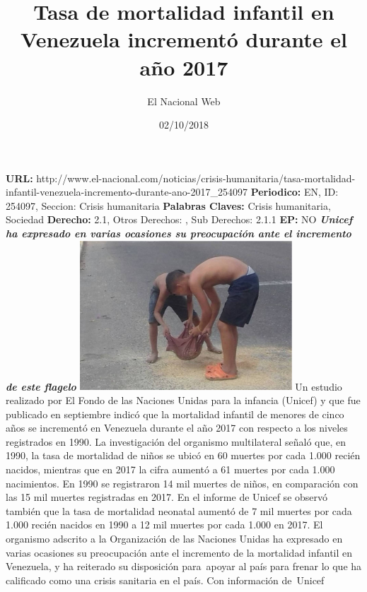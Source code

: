 \documentclass{article}%
\title{\textbf{Tasa de mortalidad infantil en Venezuela incrementó durante el año 2017}}%
\author{El Nacional Web}%
\date{02/10/2018}%
\begin{document}
%
\normalsize%
\maketitle%
\textbf{URL: }%
http://www.el{-}nacional.com/noticias/crisis{-}humanitaria/tasa{-}mortalidad{-}infantil{-}venezuela{-}incremento{-}durante{-}ano{-}2017\_254097\newline%
%
\textbf{Periodico: }%
EN, %
ID: %
254097, %
Seccion: %
Crisis humanitaria\newline%
%
\textbf{Palabras Claves: }%
Crisis humanitaria, Sociedad\newline%
%
\textbf{Derecho: }%
2.1, %
Otros Derechos: %
, %
Sub Derechos: %
2.1.1\newline%
%
\textbf{EP: }%
NO\newline%
\newline%
%
\textbf{\textit{Unicef ha expresado en varias ocasiones su preocupación ante el incremento de este flagelo}}%
\newline%
\newline%
%
\includegraphics[width=300px]{30.jpg}%
\newline%
%
Un estudio realizado por El Fondo de las Naciones Unidas para la infancia (Unicef) y que fue publicado en septiembre indicó que la mortalidad infantil de menores de cinco años se incrementó en Venezuela durante el año 2017 con respecto a los niveles registrados en 1990.%
\newline%
%
La investigación del organismo multilateral señaló que, en 1990, la tasa de mortalidad de niños se ubicó en 60 muertes por cada 1.000 recién nacidos, mientras que en 2017 la cifra aumentó a 61 muertes por cada 1.000 nacimientos.%
\newline%
%
En 1990 se registraron 14 mil muertes de niños, en comparación con las 15 mil muertes registradas en 2017.%
\newline%
%
En el informe de Unicef se observó también que la tasa de mortalidad neonatal aumentó de 7 mil muertes por cada 1.000 recién nacidos en 1990 a 12 mil muertes por cada 1.000 en 2017.%
\newline%
%
El organismo adscrito a la Organización de las Naciones Unidas ha expresado en varias ocasiones su preocupación ante el incremento de la mortalidad infantil en Venezuela, y ha reiterado su disposición para~apoyar al país para frenar lo que ha calificado como una crisis sanitaria en el país.%
\newline%
%
Con información de~Unicef%
\newline%
%
\end{document}
